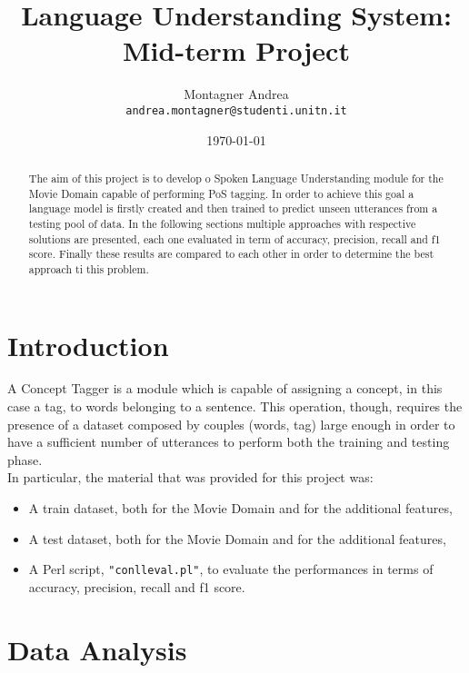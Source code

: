 \documentclass[11pt,a4paper]{article}
\title{Language Understanding System: Mid-term Project}
\author{Montagner Andrea \\
  {\tt andrea.montagner@studenti.unitn.it}}
\date{\today}
\begin{document}
\maketitle
\begin{abstract}
The aim of this project is to develop o Spoken Language Understanding module for the Movie Domain capable of performing PoS tagging. In order to achieve this goal a language model is firstly created and then trained to predict unseen utterances from a testing pool of data. In the following sections multiple approaches with respective solutions are presented, each one evaluated in term of accuracy, precision, recall and f1 score. Finally these results are compared to each other in order to determine the best approach ti this problem.
\end{abstract}

\section{Introduction}

A Concept Tagger is a module which is capable of assigning a concept, in this case a tag, to words belonging to a sentence. This operation, though, requires the presence of a dataset composed by couples (words, tag) large enough in order to have a sufficient number of utterances to perform both the training and testing phase.\\
In particular, the material that was provided for this project was:
\begin{itemize}
	\item A train dataset, both for the Movie Domain and for the additional features,
	\item A test dataset, both for the Movie Domain and for the additional features,
	\item A Perl script, {\tt "conlleval.pl"}, to evaluate the performances in terms of accuracy, precision, recall and f1 score.
\end{itemize}


\section{Data Analysis}
\label{sec:datanalysis}
\end{document}
